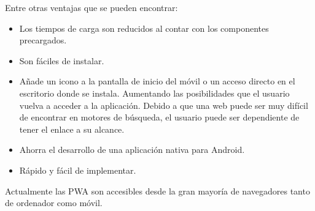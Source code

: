 Entre otras ventajas que se pueden encontrar:

\begin{itemize}
	\item Los tiempos de carga son reducidos al contar con los componentes precargados.
	
	
	\item Son fáciles de instalar.
	
	\item Añade un icono a la pantalla de inicio del móvil o un acceso directo en el escritorio donde se instala. Aumentando las posibilidades que el usuario vuelva a acceder a la aplicación. Debido a que una web puede ser muy difícil de encontrar en motores de búsqueda, el usuario puede ser dependiente de tener el enlace a su alcance.
	
	\item Ahorra el desarrollo de una aplicación nativa para Android. 
	
	\item Rápido y fácil de implementar.
	
\end{itemize}

Actualmente las PWA son accesibles desde la gran mayoría de navegadores tanto de ordenador como móvil.






